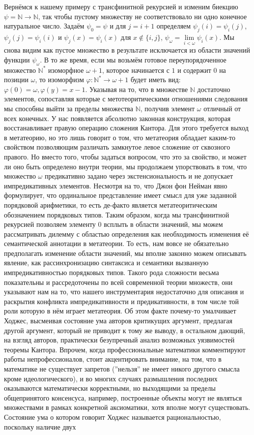 \documentclass[12pt]{article}
\begin{document}
Вернёмся к нашему примеру с трансфинитной рекурсией и изменим биекцию $\psi = \mathbb{N} \to \mathbb{N}$, так чтобы пустому множеству не соответствовало ни одно конечное натуральное число. Задаём $\psi_0 = \psi$ и для $j = i + 1$ определяем $\psi_j(i) = \psi_i(j)$, $\psi_j(j) = \psi_i(i)$ и $\psi_j(x) = \psi_i(x)$ для $x \notin \{ i, j \}$, $\psi_{\omega} = \lim\limits_{i < \omega} \psi_i(x)$. Мы снова видим как пустое множество в результате исключается из области значений функции $\psi_{\omega}$. В то же время, если мы возьмём готовое переупорядоченное множество $\mathbb{N}^{*}$ изоморфное $\omega + 1$, которое начинается с $1$ и содержит $0$ на позиции $\omega$, то изоморфизм $\varphi : \mathbb{N}^{*} \to \omega + 1$ будет иметь вид: $\varphi(0) = \omega, \varphi(y) = x - 1$. Указывая на то, что в множестве $\mathbb{N}$ достаточно элементов, сопоставляя которые с метотеоритическими отношениями следования мы способны выйти за пределы множества $\mathbb{N}$, получив элемент $\omega$ отличный от всех конечных. У нас появляется абсолютно законная конструкция, которая восстанавливает правую операцию сложения Кантора. Для этого требуется выход в метатеорию, но это лишь говорит о том, что метатеория обладает каким-то свойством позволяющим различать замкнутое левое сложение от сквозного правого. Но вместо того, чтобы задаться вопросом, что это за свойство, и может ли оно быть определено внутри теории, мы продолжаем упорствовать в том, что множество $\omega$ предикативно задано через экстенсиональность и не допускает импредикативных элементов. Несмотря на то, что Джон фон Нейман явно формулирует, что ординальное представление имеет смысл для уже заданной порядковой арифметики, то есть де-факто является метатеоритическим обозначением порядковых типов. Таким образом, когда мы трансфинитной рекурсией позволяем элементу $0$ всплыть в области значений, мы можем рассматривать дилемму с областью определения как необходимость изменения её семантической аннотации в метатеории. То есть, нам вовсе не обязательно предполагать изменение области значений, мы вполне законно можем описывать явление, как рассинхронизацию синтаксиса и семантики вызванную импредикативностью порядковых типов. Такого рода сложности весьма показательны и рассредоточены по всей современной теории множеств, они указывают нам на то, что нашего инструментария недостаточно для описания и раскрытия конфликта импредикативности и предикативности, в том числе той роли которую в нём играет метатеория. Об этом факте почему-то умалчивает Ходжес, высмеивая состояние ума авторов критикущих аргумент, предлагая другой аргумент, который не приводит к тому же выводу, в остальном дающий, на взгляд авторов, практически безупречный анализ возможных уязвимостей теоремы Кантора. Впрочем, когда профессиональные математики комментируют работы непрофессионалов, стоит акцентировать внимание, на том, что в математике не существует запретов (''нельзя'' не имеет никого другого смысла кроме идеологического), и во многих случаях размышления последних оказываются математически корректными, но выходящими за пределы общепринятого консенсуса, например, построенные объекты могут не являться множествами в рамках конкретной аксиоматики, хотя вполне могут существовать. Состояние ума о котором говорит Ходжес называется рациональностью, поскольку наличие двух 
\end{document}
